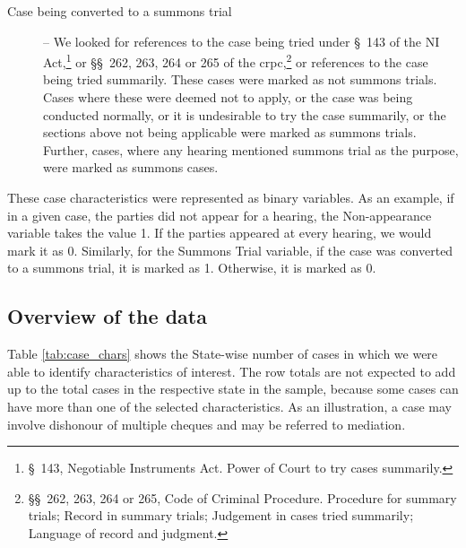 \begin{description}
\item [Case being converted to a summons trial] -- We looked for references to the case being tried under \S~143 of the NI Act,\footnote{\S~143, Negotiable Instruments Act. Power of Court to try cases summarily.} or \S\S~262, 263, 264 or 265 of the \gls{crpc},\footnote{\S\S~262, 263, 264 or 265, Code of Criminal Procedure. Procedure for summary trials; Record in summary trials; Judgement in cases tried summarily; Language of record and judgment.} or references to the case being tried summarily. These cases were marked as not summons trials. Cases where these were deemed not to apply, or the case was being conducted normally, or it is undesirable to try the case summarily, or the sections above not being applicable were marked as summons trials. Further, cases, where any hearing mentioned summons trial as the purpose, were marked as summons cases.

\end{description}

These case characteristics were represented as binary variables. As an example, if in a given case, the parties did not appear for a hearing, the Non-appearance variable takes the value 1. If the parties appeared at every hearing, we would mark it as 0. Similarly, for the Summons Trial variable, if the case was converted to a summons trial, it is marked as 1. Otherwise, it is marked as 0.

\subsection{Overview of the data}
\label{sec:overview-data}

Table \ref{tab:case_chars} shows the State-wise number of cases in which we were able to identify characteristics of interest. The row totals are not expected to add up to the total cases in the respective state in the sample, because some cases can have more than one of the selected characteristics. As an illustration, a case may involve dishonour of multiple cheques and may be referred to mediation.

